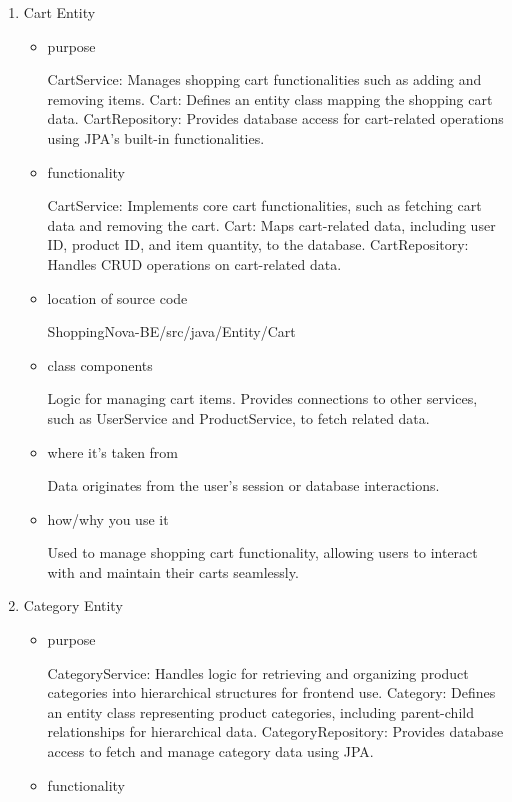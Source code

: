 \documentclass[conference]{IEEEtran}
\begin{document}
\begin{enumerate}
\item Cart Entity

\begin{itemize}
\item purpose

CartService: Manages shopping cart functionalities such as adding and removing items.\newline
Cart: Defines an entity class mapping the shopping cart data. \newline
CartRepository: Provides database access for cart-related operations using JPA's built-in functionalities.

\item functionality

CartService: Implements core cart functionalities, such as fetching cart data and removing the cart.\newline
Cart: Maps cart-related data, including user ID, product ID, and item quantity, to the database.\newline
CartRepository: Handles CRUD operations on cart-related data.

\item location of source code

ShoppingNova-BE/src/java/Entity/Cart

\item class components

Logic for managing cart items.\newline 
Provides connections to other services, such as UserService and ProductService, to fetch related data.

\item where it's taken from

Data originates from the user's session or database interactions.

\item how/why you use it

Used to manage shopping cart functionality, allowing users to interact with and maintain their carts seamlessly.

\end{itemize}

\item Category Entity

\begin{itemize}
\item purpose

CategoryService: Handles logic for retrieving and organizing product categories into hierarchical structures for frontend use.\newline
Category: Defines an entity class representing product categories, including parent-child relationships for hierarchical data.\newline
CategoryRepository: Provides database access to fetch and manage category data using JPA.
\item functionality


\end{itemize}
\end{enumerate}
\end{document}
